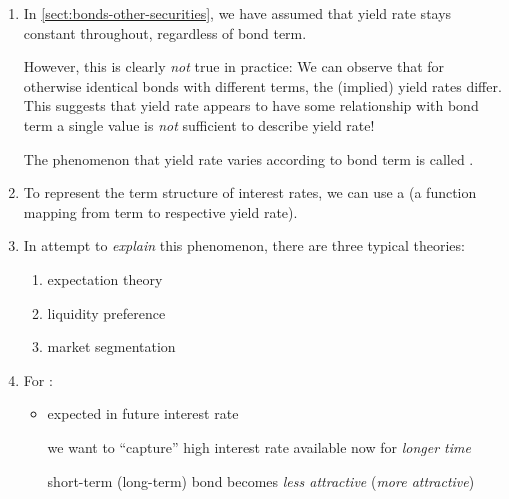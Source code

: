 \begin{enumerate}
\item In \cref{sect:bonds-other-securities}, we have assumed that yield rate
stays constant throughout, regardless of bond term.

However, this is clearly \emph{not} true in practice: We can observe that for
otherwise identical bonds with different terms, the (implied) yield rates
differ. This suggests that yield rate appears to have some relationship with
bond term  a single value is \emph{not} sufficient to
describe yield rate!

\begin{note}
The phenomenon that yield rate varies according to bond term is called
.
\end{note}

\item To represent the term structure of interest rates, we can use a
 (a function mapping from term to respective yield rate).
\begin{center}
\end{center}
\item In attempt to \emph{explain} this phenomenon, there are three typical
theories: \begin{enumerate}
\item expectation theory
\item liquidity preference
\item market segmentation
\end{enumerate}
\item For :
\begin{itemize}
\item expected  in future interest rate 

 we want to ``capture'' high interest rate available now for \emph{longer time}

 short-term (long-term) bond becomes {\color{red}\emph{less attractive}}
({\color{ForestGreen}\emph{more attractive}})


\end{itemize}
\end{enumerate}
